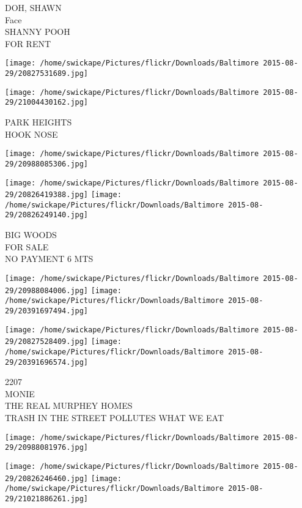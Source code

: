 \documentclass[10pt,letterpaper]{article}
\begin{document}
DOH, SHAWN\\
Face\\
SHANNY POOH\\
FOR RENT
\pagebreak

\texttt{[image: /home/swickape/Pictures/flickr/Downloads/Baltimore 2015-08-29/20827531689.jpg]}

\vspace{0.25in}
\texttt{[image: /home/swickape/Pictures/flickr/Downloads/Baltimore 2015-08-29/21004430162.jpg]}

PARK HEIGHTS\\
HOOK NOSE
\pagebreak

\texttt{[image: /home/swickape/Pictures/flickr/Downloads/Baltimore 2015-08-29/20988085306.jpg]}

\vspace{0.25in}
\texttt{[image: /home/swickape/Pictures/flickr/Downloads/Baltimore 2015-08-29/20826419388.jpg]}
\texttt{[image: /home/swickape/Pictures/flickr/Downloads/Baltimore 2015-08-29/20826249140.jpg]}

BIG WOODS\\
FOR SALE\\
NO PAYMENT 6 MTS
\pagebreak

\texttt{[image: /home/swickape/Pictures/flickr/Downloads/Baltimore 2015-08-29/20988084006.jpg]}
\texttt{[image: /home/swickape/Pictures/flickr/Downloads/Baltimore 2015-08-29/20391697494.jpg]}

\texttt{[image: /home/swickape/Pictures/flickr/Downloads/Baltimore 2015-08-29/20827528409.jpg]}
\texttt{[image: /home/swickape/Pictures/flickr/Downloads/Baltimore 2015-08-29/20391696574.jpg]}

2207\\
MONIE\\
THE REAL MURPHEY HOMES\\
TRASH IN THE STREET POLLUTES WHAT WE EAT
\pagebreak

\texttt{[image: /home/swickape/Pictures/flickr/Downloads/Baltimore 2015-08-29/20988081976.jpg]}

\vspace{0.25in}
\texttt{[image: /home/swickape/Pictures/flickr/Downloads/Baltimore 2015-08-29/20826246460.jpg]}
\texttt{[image: /home/swickape/Pictures/flickr/Downloads/Baltimore 2015-08-29/21021886261.jpg]}
\end{document}
